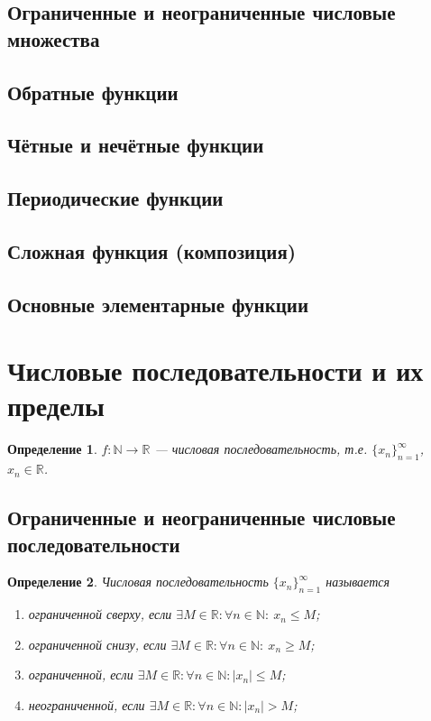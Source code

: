 \documentclass[a4paper,12pt]{article} %
\newtheorem{definition}{Определение}[section]
\theoremstyle{remark}
\theoremstyle{definition}
\begin{document}
\subsection{Ограниченные и неограниченные числовые множества}
\subsection{Обратные функции}
\subsection{Чётные и нечётные функции}
\subsection{Периодические функции}
\subsection{Сложная функция (композиция)}
\subsection{Основные элементарные функции}



\newpage
\section{Числовые последовательности и их пределы}



\begin{definition}
	$f:\mathbb{N}\rightarrow \mathbb{R}$ --- числовая последовательность, т.е. $\{x_n\}_{n=1}^\infty$, $x_n \in \mathbb{R}$.
\end{definition}



\subsection{Ограниченные и неограниченные числовые последовательности}

\begin{definition}
	Числовая последовательность $\{x_n\}_{n=1}^\infty$ называется 

	\begin{enumerate}
		\item ограниченной сверху, если $\exists M\in \mathbb{R}: \forall n\in \mathbb{N}: \ x_n\le M$;
		\item ограниченной снизу, если \space $\exists M\in \mathbb{R}: \forall n\in \mathbb{N}: \ x_n\ge M$;
		\item ограниченной, если \space\space\space\space\space\space\space\space\space $\exists M\in \mathbb{R}: \forall n\in \mathbb{N}:|x_n| \le M$;
		\item неограниченной, если \space\space\space\space\space\space $\exists M\in \mathbb{R}: \forall n\in \mathbb{N}:|x_n|> M$;
	\end{enumerate}
\end{definition}
\end{document}
